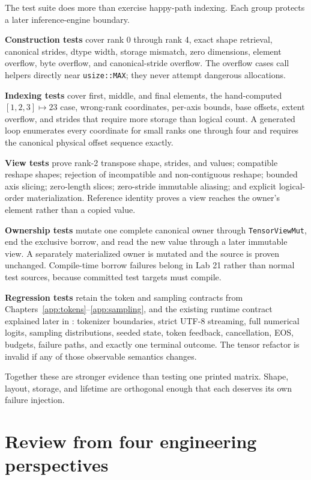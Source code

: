 The test suite does more than exercise happy-path indexing. Each group
protects a later inference-engine boundary.

\textbf{Construction tests} cover rank 0 through rank 4, exact shape
retrieval, canonical strides, dtype width, storage mismatch, zero
dimensions, element overflow, byte overflow, and canonical-stride
overflow. The overflow cases call helpers directly near
\texttt{usize::MAX}; they never attempt dangerous allocations.

\textbf{Indexing tests} cover first, middle, and final elements, the
hand-computed \([1,2,3]\mapsto23\) case, wrong-rank coordinates,
per-axis bounds, base offsets, extent overflow, and strides that require
more storage than logical count. A generated loop enumerates every
coordinate for small ranks one through four and requires the canonical
physical offset sequence exactly.

\textbf{View tests} prove rank-2 transpose shape, strides, and values;
compatible reshape shapes; rejection of incompatible and non-contiguous
reshape; bounded axis slicing; zero-length slices; zero-stride immutable
aliasing; and explicit logical-order materialization. Reference identity
proves a view reaches the owner's element rather than a copied value.

\textbf{Ownership tests} mutate one complete canonical owner through
\texttt{TensorViewMut}, end the exclusive borrow, and read the new value
through a later immutable view. A separately materialized owner is
mutated and the source is proven unchanged. Compile-time borrow failures
belong in Lab 21 rather than normal test sources, because committed test
targets must compile.

\textbf{Regression tests} retain the token and sampling contracts from
Chapters~\ref{app:tokens}--\ref{app:sampling}, and the existing runtime contract
explained later in : tokenizer
boundaries, strict UTF-8 streaming, full numerical logits, sampling
distributions, seeded state, token feedback, cancellation, EOS, budgets,
failure paths, and exactly one terminal outcome. The tensor refactor is
invalid if any of those observable semantics changes.

Together these are stronger evidence than testing one printed matrix.
Shape, layout, storage, and lifetime are orthogonal enough that each
deserves its own failure injection.

\section{Review from four engineering
perspectives}\label{review-from-four-engineering-perspectives}

